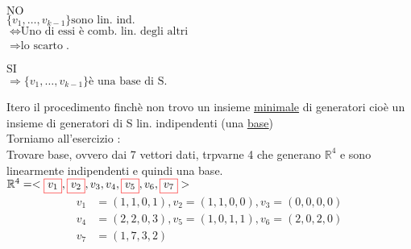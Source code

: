 \flushleft
\begin{minipage}{.5\linewidth}
	$\boxed{\text{NO}}$\\
	$\{ v_1, \dots, v_{k-1} \} \text{sono lin. ind.} $\\
	$ \Leftrightarrow \text{Uno di essi è comb. lin. degli altri}$\\ $\Rightarrow \text{lo scarto}$.\\
\end{minipage}
\begin{minipage}{.45\linewidth}
	$\boxed{\text{SI}}$\\
	$\Rightarrow \{ v_1, \dots, v_{k-1}\} \text{è una base di S}$.
\end{minipage}
\vskip 2mm
\textsf{\small Itero il procedimento finchè non trovo un insieme \underline{\underline{minimale}} di generatori cioè un insieme di generatori di S lin. indipendenti (una \underline{\underline{base}})}\\
\textsf{\small Torniamo all'esercizio :}\\

\textsf{\small Trovare base, ovvero dai 7 vettori dati, trpvarne 4 che generano $\mathbb{R}^4$ e sono linearmente indipendenti e quindi una base.}\\

\(
\mathbb{R}^4 = <\color{red}\boxed{\normalcolor v_1}\normalcolor, \color{red}\boxed{\normalcolor v_2}\normalcolor, v_3, v_4, \color{red}\boxed{\normalcolor v_5}\normalcolor, v_6, \color{red}\boxed{ \normalcolor v_7 }\normalcolor>
\)
\begin{align*}
	\boxed{v_1} &= (1,1,0,1) , \boxed{v_2} = (1,1,0,0), v_3 = (0,0,0,0)\\
	v_4 &= (2,2,0,3), \boxed{v_5} = (1,0,1,1), v_6 = (2,0,2,0)\\
	\boxed{v_7} &= (1,7,3,2)\\
\end{align*}

